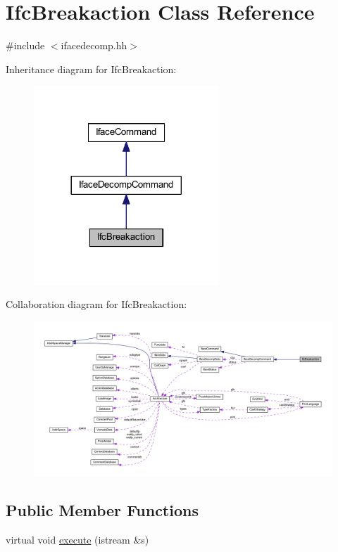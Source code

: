 \hypertarget{class_ifc_breakaction}{}\section{Ifc\+Breakaction Class Reference}
\label{class_ifc_breakaction}


{\ttfamily \#include $<$ifacedecomp.\+hh$>$}



Inheritance diagram for Ifc\+Breakaction\+:
\nopagebreak
\begin{figure}[H]
\begin{center}
\leavevmode
\includegraphics[width=197pt]{class_ifc_breakaction__inherit__graph}
\end{center}
\end{figure}


Collaboration diagram for Ifc\+Breakaction\+:
\nopagebreak
\begin{figure}[H]
\begin{center}
\leavevmode
\includegraphics[width=350pt]{class_ifc_breakaction__coll__graph}
\end{center}
\end{figure}
\subsection*{Public Member Functions}
\begin{DoxyCompactItemize}
\item 
virtual void \mbox{\hyperlink{class_ifc_breakaction_ae02d475f7ddb0c84174542d9b88656a7}{execute}} (istream \&s)
\end{DoxyCompactItemize}
